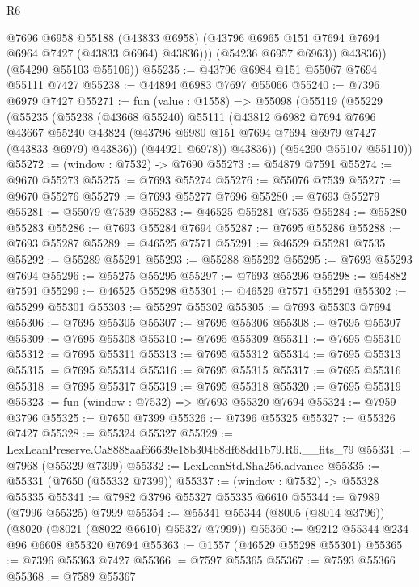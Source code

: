 \begin{lexlean}{R6}
\begin{coremodule}
                @7696
                @6958
                @55188
                (@43833 @6958)
                (@43796 @6965 @151 @7694 @7694 @6964 @7427 (@43833 @6964) @43836)))
            (@54236 @6957 @6963))
          @43836))
      (@54290 @55103 @55106))
@55235 := @43796 @6984 @151 @55067 @7694 @55111 @7427
@55238 := @44894 @6983 @7697 @55066
@55240 := @7396 @6979 @7427
@55271 := fun (value : @1558) =>
  @55098
    (@55119
      (@55229
        (@55235
          (@55238
            (@43668 @55240)
            @55111
            (@43812
              @6982
              @7694
              @7696
              @43667
              @55240
              @43824
              (@43796 @6980 @151 @7694 @7694 @6979 @7427 (@43833 @6979) @43836))
            (@44921 @6978))
          @43836))
      (@54290 @55107 @55110))
@55272 := (window : @7532) -> @7690
@55273 := @54879 @7591
@55274 := @9670 @55273
@55275 := @7693 @55274
@55276 := @55076 @7539
@55277 := @9670 @55276
@55279 := @7693 @55277 @7696
@55280 := @7693 @55279
@55281 := @55079 @7539
@55283 := @46525 @55281 @7535
@55284 := @55280 @55283
@55286 := @7693 @55284 @7694
@55287 := @7695 @55286
@55288 := @7693 @55287
@55289 := @46525 @7571
@55291 := @46529 @55281 @7535
@55292 := @55289 @55291
@55293 := @55288 @55292
@55295 := @7693 @55293 @7694
@55296 := @55275 @55295
@55297 := @7693 @55296
@55298 := @54882 @7591
@55299 := @46525 @55298
@55301 := @46529 @7571 @55291
@55302 := @55299 @55301
@55303 := @55297 @55302
@55305 := @7693 @55303 @7694
@55306 := @7695 @55305
@55307 := @7695 @55306
@55308 := @7695 @55307
@55309 := @7695 @55308
@55310 := @7695 @55309
@55311 := @7695 @55310
@55312 := @7695 @55311
@55313 := @7695 @55312
@55314 := @7695 @55313
@55315 := @7695 @55314
@55316 := @7695 @55315
@55317 := @7695 @55316
@55318 := @7695 @55317
@55319 := @7695 @55318
@55320 := @7695 @55319
@55323 := fun (window : @7532) => @7693 @55320 @7694
@55324 := @7959 @3796
@55325 := @7650 @7399
@55326 := @7396 @55325
@55327 := @55326 @7427
@55328 := @55324 @55327
@55329 := LexLeanPreserve.Ca8888aaf66639e18b304b8df68dd1b79.R6.__fits_79
@55331 := @7968 (@55329 @7399)
@55332 := LexLeanStd.Sha256.advance
@55335 := @55331 (@7650 (@55332 @7399))
@55337 := (window : @7532) -> @55328 @55335
@55341 := @7982 @3796 @55327 @55335 @6610
@55344 := @7989 (@7996 @55325) @7999
@55354 := @55341 @55344 (@8005 (@8014 @3796)) (@8020 (@8021 (@8022 @6610) @55327 @7999))
@55360 := @9212 @55344 @234 @96 @6608 @55320 @7694
@55363 := @1557 (@46529 @55298 @55301)
@55365 := @7396 @55363 @7427
@55366 := @7597 @55365
@55367 := @7593 @55366
@55368 := @7589 @55367

\end{coremodule}
\end{lexlean}
